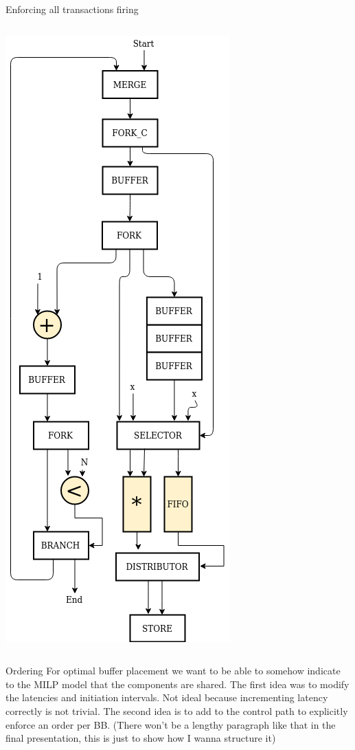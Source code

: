 \documentclass{beamer}
\begin{document}
\begin{frame}{Enforcing all transactions firing}
\begin{columns}
\begin{column}{0.45\textwidth}
      \includegraphics[scale=0.25]{blocking_shared_solution.png}
    \end{column}
  \end{columns}
\end{frame}

\begin{frame}{Ordering}
For optimal buffer placement we want to be able to somehow indicate to the MILP model that the components are shared. The first idea was to modify the latencies and initiation intervals. Not ideal because incrementing latency correctly is not trivial. The second idea is to add to the control path to explicitly enforce an order per BB. (There won't be a lengthy paragraph like that in the final presentation, this is just to show how I wanna structure it)
\end{frame}
\end{document}
